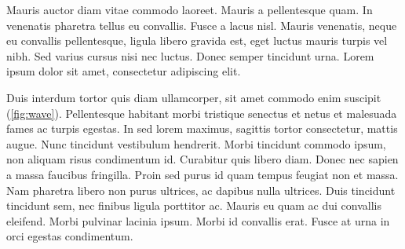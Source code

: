 Mauris auctor diam vitae commodo laoreet. Mauris a pellentesque quam. In venenatis pharetra tellus eu convallis. Fusce a lacus nisl. Mauris venenatis, neque eu convallis pellentesque, ligula libero gravida est, eget luctus mauris turpis vel nibh. Sed varius cursus nisi nec luctus. Donec semper tincidunt urna. Lorem ipsum dolor sit amet, consectetur adipiscing elit.

\begin{Figure}
 
 \captionsetup{labelfont=bf}
 \label{fig:wave}
\end{Figure}

Duis interdum tortor quis diam ullamcorper, sit amet commodo enim suscipit (\ref{fig:wave}). Pellentesque habitant morbi tristique senectus et netus et malesuada fames ac turpis egestas. In sed lorem maximus, sagittis tortor consectetur, mattis augue. Nunc tincidunt vestibulum hendrerit. Morbi tincidunt commodo ipsum, non aliquam risus condimentum id. Curabitur quis libero diam. Donec nec sapien a massa faucibus fringilla. Proin sed purus id quam tempus feugiat non et massa. Nam pharetra libero non purus ultrices, ac dapibus nulla ultrices. Duis tincidunt tincidunt sem, nec finibus ligula porttitor ac. Mauris eu quam ac dui convallis eleifend. Morbi pulvinar lacinia ipsum. Morbi id convallis erat. Fusce at urna in orci egestas condimentum.